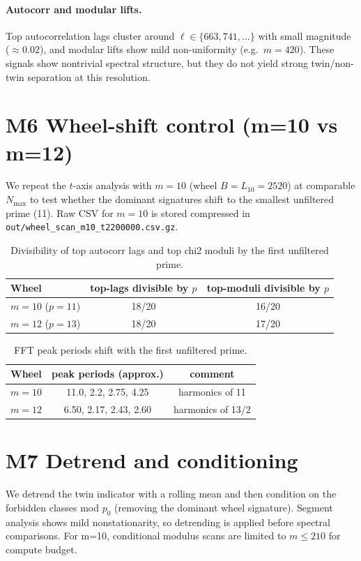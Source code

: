 \documentclass[11pt]{article}
\begin{document}
\paragraph{Autocorr and modular lifts.}
Top autocorrelation lags cluster around $\ell\in\{663, 741, \dots\}$ with small magnitude
($\approx 0.02$), and modular lifts show mild non-uniformity (e.g.\ $m=420$).
These signals show nontrivial spectral structure, but they do not yield strong twin/non-twin separation at this resolution.

\section{M6 Wheel-shift control (m=10 vs m=12)}
We repeat the $t$-axis analysis with $m=10$ (wheel $B=L_{10}=2520$) at comparable $N_{\max}$
to test whether the dominant signatures shift to the smallest unfiltered prime (11).
Raw CSV for $m=10$ is stored compressed in \texttt{out/wheel\_scan\_m10\_t2200000.csv.gz}.

\begin{table}[h]
\centering
\begin{tabular}{lcc}
\hline
Wheel & top-lags divisible by $p$ & top-moduli divisible by $p$ \\
\hline
$m=10$ ($p=11$) & 18/20 & 16/20 \\
$m=12$ ($p=13$) & 18/20 & 17/20 \\
\hline
\end{tabular}
\caption{Divisibility of top autocorr lags and top chi2 moduli by the first unfiltered prime.}
\end{table}

\begin{table}[h]
\centering
\begin{tabular}{lcc}
\hline
Wheel & peak periods (approx.) & comment \\
\hline
$m=10$ & 11.0, 2.2, 2.75, 4.25 & harmonics of 11 \\
$m=12$ & 6.50, 2.17, 2.43, 2.60 & harmonics of 13/2 \\
\hline
\end{tabular}
\caption{FFT peak periods shift with the first unfiltered prime.}
\end{table}

\section{M7 Detrend and conditioning}
We detrend the twin indicator with a rolling mean and then condition on the
forbidden classes mod $p_0$ (removing the dominant wheel signature). Segment
analysis shows mild nonstationarity, so detrending is applied before spectral
comparisons. For m=10, conditional modulus scans are limited to $m\le 210$
for compute budget.
\end{document}
